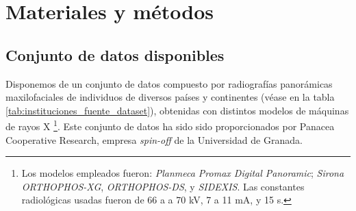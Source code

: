 \chapter{Materiales y métodos} 


\section{Conjunto de datos disponibles}



Disponemos de un conjunto de datos compuesto por radiografías panorámicas maxilofaciales de individuos de 
diversos países y continentes (véase en la tabla \ref{tab:instituciones_fuente_dataset}), obtenidas con
distintos modelos de máquinas de rayos X
\footnote{
    Los modelos empleados fueron: \textit{Planmeca Promax Digital Panoramic}; \textit{Sirona ORTHOPHOS-XG}, 
    \textit{ORTHOPHOS-DS}, y \textit{SIDEXIS}. Las constantes radiológicas usadas fueron de 66 a a 70 kV, 7 a 
    11 mA, y 15 s.
}. 
Este conjunto de datos ha sido sido proporcionados por Panacea Cooperative Research, empresa \textit{spin-off} 
de la Universidad de Granada.  

